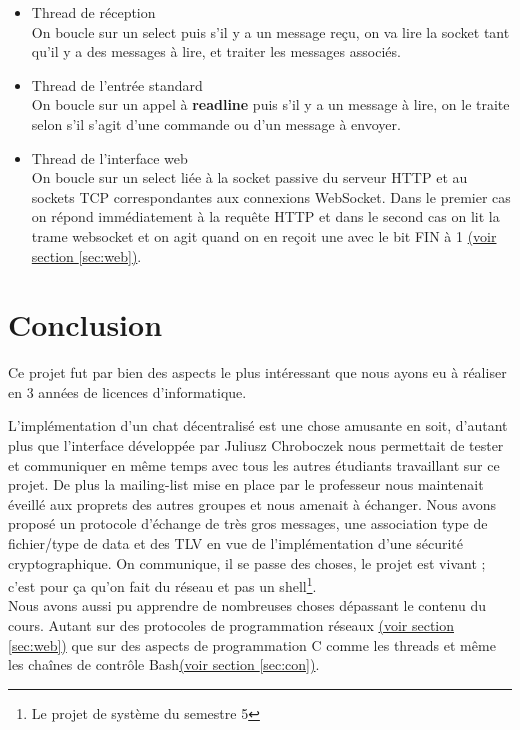 \documentclass[a4paper,10pt]{article} %
\begin{document}
\begin{itemize}
\begin{enumerate}
\end{enumerate}
\item Thread de réception \\
  On boucle sur un select puis s'il y a un message reçu, on va lire la socket tant qu'il y a des messages à lire, et traiter les messages associés.
\item Thread de l'entrée standard \\
  On boucle sur un appel à \textbf{readline} puis s'il y a un message à lire, on le traite selon s'il s'agit d'une commande ou d'un message à envoyer.
\item Thread de l'interface web \\
  On boucle sur un select liée à la socket passive du serveur \textrm{HTTP} et au sockets \textrm{TCP} correspondantes aux connexions WebSocket. Dans le premier cas on répond immédiatement à la requête \textrm{HTTP} et dans le second cas on lit la trame websocket et on agit quand on en reçoit une avec le bit \textrm{FIN} à 1 \hyperref[sec:web]{(voir section \ref{sec:web})}.
\end{itemize}

\section{Conclusion}

Ce projet fut par bien des aspects le plus intéressant que nous ayons eu à réaliser en 3 années de licences d'informatique.

L'implémentation d'un chat décentralisé est une chose amusante en soit, d'autant plus que l'interface développée par Juliusz Chroboczek nous permettait de tester et communiquer en même temps avec tous les autres étudiants travaillant sur ce projet. De plus la mailing-list mise en place par le professeur nous maintenait éveillé aux proprets des autres groupes et nous amenait à échanger. Nous avons proposé un protocole d'échange de très gros messages, une association type de fichier/type de data et des TLV en vue de l'implémentation d'une sécurité cryptographique. On communique, il se passe des choses, le projet est vivant ; c'est pour ça qu'on fait du réseau et pas un shell\footnote{Le projet de système du semestre 5}.\\

Nous avons aussi pu apprendre de nombreuses choses dépassant le contenu du cours. Autant sur des protocoles de programmation réseaux \hyperref[sec:web]{(voir section \ref{sec:web})} que sur des aspects de programmation C comme les threads et même les chaînes de contrôle Bash\hyperref[sec:con]{(voir section \ref{sec:con})}.\\
\end{document}
